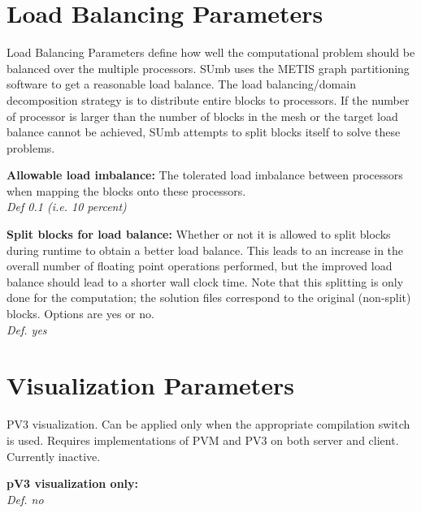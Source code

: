 \documentclass[12pt,epsf,colordvi]{article}
\begin{document}
\section{Load Balancing Parameters}
% 
Load Balancing Parameters define how well the computational problem should be balanced over the multiple processors. SUmb uses the METIS graph partitioning software to get a reasonable load balance. The load balancing/domain decomposition strategy is to distribute entire blocks to processors. If the number of processor is larger than the number of blocks in the mesh or the target load balance cannot be achieved, SUmb attempts to split blocks itself to solve these problems.
%
\begin{description}
% 
	\item{\bf Allowable load imbalance:} The tolerated load imbalance between processors when mapping the blocks onto these processors. \\
{\it Def 0.1  (i.e. 10 percent) }
%
	\item{\bf Split blocks for load balance:} Whether or not it is allowed to split blocks during runtime to obtain a better load balance. This leads to an increase in the overall number of floating point operations performed, but the improved load balance should lead to a shorter wall clock time. Note that this splitting is only done for the computation; the solution files correspond to the original (non-split) blocks. Options are yes or no. \\
{\it Def. yes}
%
\end{description}
%
\noindent 
\section{Visualization Parameters}
% 
PV3 visualization. Can be applied only when the appropriate compilation switch is used. Requires implementations of PVM and PV3 on both server and client. Currently inactive.
%
\begin{description}
%
	\item{\bf pV3 visualization only: } \\
{\it Def.  no }
%
\end{description}
%
\noindent 
\end{document}
